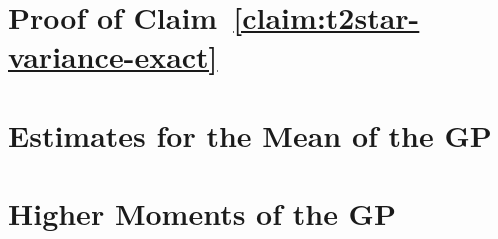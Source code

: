 \chapter{Proof of Claim~\ref{claim:t2star-variance-exact}}\label{sec:praos-claim-t2star-variance-exact}



\chapter{Estimates for the Mean of the GP}




\chapter{Higher Moments of the GP}

